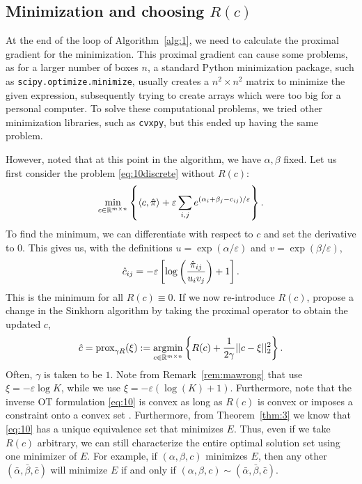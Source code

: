 \subsection{Minimization and choosing $R(c)$}
\label{sec:rc}
At the end of the loop of Algorithm~\ref{alg:1}, we need to calculate the proximal gradient for the minimization. This proximal gradient can cause some problems, as for a larger number of boxes $n$, a standard Python minimization package, such as \lstinline|scipy.optimize.minimize|, usually creates a $n^2 \times n^2$ matrix to minimize the given expression, subsequently trying to create arrays which were too big for a personal computer. To solve these computational problems, we tried other minimization libraries, such as \lstinline|cvxpy|, but this ended up having the same problem. \par 
However, noted that at this point in the algorithm, we have $\alpha, \beta$ fixed. Let us first consider the problem \eqref{eq:10discrete} without $R(c)$: 
\[\min_{c \in \mathbb{R}^{m \times n}} \left\{ \langle c, \hat{\pi}\rangle + \varepsilon \sum_{i,j} e^{(\alpha_i + \beta_j - c_{ij})/\varepsilon} \right\} .\]
To find the minimum, we can differentiate with respect to $c$ and set the derivative to $0$. This gives us, with the definitions $u = \exp(\alpha/\varepsilon)$ and $v = \exp(\beta/\varepsilon)$,
\[\hat{c}_{ij} = -\varepsilon \left[ \log\left(\frac{\hat{\pi}_{ij}}{u_i v_j}\right) + 1 \right]. \]
This is the minimum for all $R(c) \equiv 0$. If we now re-introduce $R(c)$, \citet{ma2021} propose a change in the Sinkhorn algorithm by taking the proximal operator to obtain the updated $c$,  
\[\hat{c} = \text{prox}_{\gamma R}(\xi) := \operatorname*{argmin}_{c \in \mathbb{R}^{m \times n}} \left\{ R(c) + \frac{1}{2\gamma} ||c-\xi||^2_2 \right\}.  \]
Often, $\gamma$ is taken to be $1$. Note from Remark~\ref{rem:mawrong} that \citet{ma2021} use $\xi = -\varepsilon \log K$, while we use $\xi = -\varepsilon (\log(K) + 1)$. Furthermore, note that the inverse OT formulation \eqref{eq:10} is convex as long as $R(c)$ is convex or imposes a constraint onto a convex set \citep{ma2021}. Furthermore, from Theorem~\ref{thm:3} we know that \eqref{eq:10} has a unique equivalence set that minimizes $E$. Thus, even if we take $R(c)$ arbitrary, we can still characterize the entire optimal solution set using one minimizer of $E$. For example, if $(\alpha, \beta, c)$ minimizes $E$, then any other $(\bar{\alpha}, \bar{\beta}, \bar{c})$ will minimize $E$ if and only if $(\alpha, \beta, c) \sim (\bar{\alpha}, \bar{\beta}, \bar{c})$. \par 
